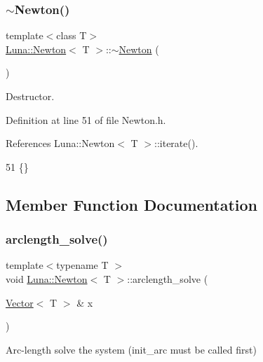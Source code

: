\subsubsection{\texorpdfstring{$\sim$\+Newton()}{~Newton()}}
{\footnotesize\ttfamily template$<$class T$>$ \\
\hyperlink{classLuna_1_1Newton}{Luna\+::\+Newton}$<$ T $>$\+::$\sim$\hyperlink{classLuna_1_1Newton}{Newton} (\begin{DoxyParamCaption}{ }\end{DoxyParamCaption})\hspace{0.3cm}{\ttfamily [inline]}}



Destructor. 



Definition at line 51 of file Newton.\+h.



References Luna\+::\+Newton$<$ T $>$\+::iterate().


\begin{DoxyCode}
51 \{\}
\end{DoxyCode}


\subsection{Member Function Documentation}
\mbox{\label{classLuna_1_1Newton_ac300f6b5744bf66fd2f385c678d24dcf}} 
\subsubsection{\texorpdfstring{arclength\+\_\+solve()}{arclength\_solve()}}
{\footnotesize\ttfamily template$<$typename T $>$ \\
void \hyperlink{classLuna_1_1Newton}{Luna\+::\+Newton}$<$ T $>$\+::arclength\+\_\+solve (\begin{DoxyParamCaption}\item[{\hyperlink{classLuna_1_1Vector}{Vector}$<$ T $>$ \&}]{x }\end{DoxyParamCaption})\hspace{0.3cm}{\ttfamily [inline]}}



Arc-\/length solve the system (init\+\_\+arc must be called first) 


